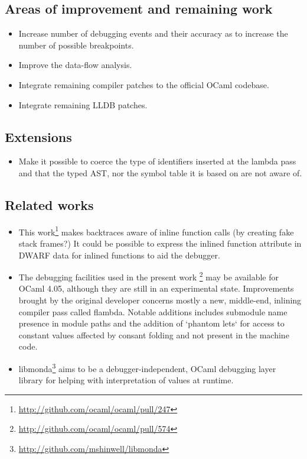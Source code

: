 \subsection{Areas of improvement and remaining work}

\begin{itemize}
    \item Increase number of debugging events and their accuracy as to increase the number of possible breakpoints.
    \item Improve the data-flow analysis.
    \item Integrate remaining compiler patches to the official OCaml codebase.
    \item Integrate remaining LLDB patches.
\end{itemize}

\subsection{Extensions}

\begin{itemize}
    \item Make it possible to coerce the type of identifiers inserted at the
lambda pass and that the typed AST, nor the symbol table it is based on are not
aware of.
\end{itemize}

\subsection{Related works}

\begin{itemize}
    \item This work\footnote{\url{http://github.com/ocaml/ocaml/pull/247}} makes backtraces aware
        of inline function calls (by creating fake stack frames?)
        It could be possible to express the inlined function attribute in DWARF data for
        inlined functions to aid the debugger.
    \item The debugging facilities used in the present work \footnote{\url{http://github.com/ocaml/ocaml/pull/574}}
        may be available for OCaml 4.05, although they are still in an
        experimental state.
        Improvements brought by the original developer concerns mostly a
        new, middle-end, inlining compiler pass called flambda.
        Notable additions includes submodule name presence in module paths and
        the addition of `phantom lets` for access to constant values affected by
        consant folding and not present in the machine code.
    \item libmonda\footnote{\url{http://github.com/mshinwell/libmonda}} aims to be a
        debugger-independent, OCaml debugging layer library for helping with
        interpretation of values at runtime.
\end{itemize}

